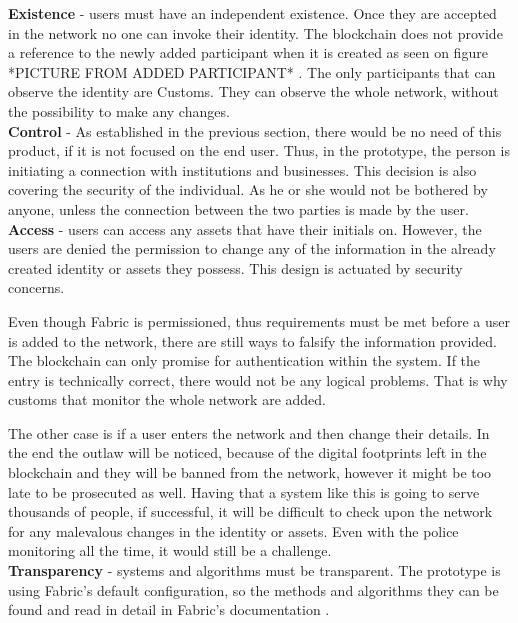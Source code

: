 \documentclass[a4paper,11pt]{report}
\begin{document}
	\textbf{Existence}  - users must have an independent existence. Once they are accepted in the network no one can invoke their identity. The blockchain does not provide a reference to the newly added participant when it is created as seen on figure *PICTURE FROM ADDED PARTICIPANT* . The only participants that can observe the identity are Customs. They can observe the whole network, without the possibility to make any changes. 
\\
	
\textbf{Control} - As established in the previous section, there would be no need of this product, if it is not focused on the end user. Thus, in the prototype, the person is initiating a connection with institutions and businesses. This decision is also covering the security of the individual. As he or she would not be bothered by anyone, unless the connection between the two parties is made by the user.  
\\

	\textbf{Access} - users can access any assets that have their initials on. However, the users are denied the permission to change any of the information in the already created identity or assets they possess. This design is actuated by security concerns. 
	
Even though Fabric is permissioned, thus requirements must be met before a user is added to the network, there are still ways to falsify the information provided. The blockchain can only promise for authentication within the system. If the entry is technically correct, there would not be any logical problems. That is why customs that monitor the whole network are added.  

The other case is if a user enters the network and then change their details. In the end the outlaw will be noticed, because of the digital footprints left in the blockchain and they will be banned from the network, however it might be too late to be prosecuted as well. Having that a system like this is going to serve thousands of people, if successful, it will be difficult to check upon the network for any malevalous changes in the identity or assets. Even with the police monitoring all the time, it would still be a challenge. 
\\

\textbf{Transparency}  - systems and algorithms must be transparent. The prototype is using Fabric’s default configuration, so the methods and algorithms they can be found and read in detail in Fabric’s documentation \cite{fabricca}.
\\
\end{document}
